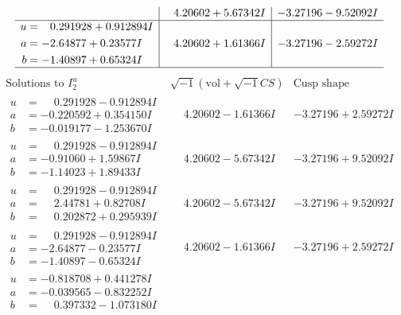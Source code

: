 \documentclass[1p]{elsarticle_modified}
\theoremstyle{definition}
\newcommand{\I}{\sqrt{-1}}
\begin{document}
$$\begin{array}{c|c|c}
 & \phantom{-}4.20602 + 5.67342 I & -3.27196 - 9.52092 I \\ \hline\begin{aligned}
u &= \phantom{-}0.291928 + 0.912894 I \\
a &= -2.64877 + 0.23577 I \\
b &= -1.40897 + 0.65324 I\end{aligned}
 & \phantom{-}4.20602 + 1.61366 I & -3.27196 - 2.59272 I\\
 \hline 
 \end{array}$$\newpage$$\begin{array}{c|c|c}  
\text{Solutions to }I^u_{2}& \I (\text{vol} + \sqrt{-1}CS) & \text{Cusp shape}\\
 \hline 
\begin{aligned}
u &= \phantom{-}0.291928 - 0.912894 I \\
a &= -0.220592 + 0.354150 I \\
b &= -0.019177 - 1.253670 I\end{aligned}
 & \phantom{-}4.20602 - 1.61366 I & -3.27196 + 2.59272 I \\ \hline\begin{aligned}
u &= \phantom{-}0.291928 - 0.912894 I \\
a &= -0.91060 + 1.59867 I \\
b &= -1.14023 + 1.89433 I\end{aligned}
 & \phantom{-}4.20602 - 5.67342 I & -3.27196 + 9.52092 I \\ \hline\begin{aligned}
u &= \phantom{-}0.291928 - 0.912894 I \\
a &= \phantom{-}2.44781 + 0.82708 I \\
b &= \phantom{-}0.202872 + 0.295939 I\end{aligned}
 & \phantom{-}4.20602 - 5.67342 I & -3.27196 + 9.52092 I \\ \hline\begin{aligned}
u &= \phantom{-}0.291928 - 0.912894 I \\
a &= -2.64877 - 0.23577 I \\
b &= -1.40897 - 0.65324 I\end{aligned}
 & \phantom{-}4.20602 - 1.61366 I & -3.27196 + 2.59272 I \\ \hline\begin{aligned}
u &= -0.818708 + 0.441278 I \\
a &= -0.039565 - 0.832252 I \\
b &= \phantom{-}0.397332 - 1.073180 I\end{aligned}

\end{array}$$
\end{document}
